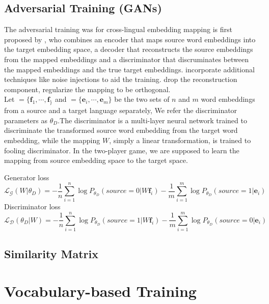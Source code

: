 \subsection{Adversarial Training (GANs)}
The adversarial training was for cross-lingual embedding mapping is first proposed by {}, who combines an encoder that maps source word embeddings into the target embedding space, a decoder that reconstructs the source embeddings from the mapped embeddings and a discriminator that discruminates between the mapped embeddings and the true target embeddings. \cite{zhang2017adversarial} incorporate additional techniques like noise injections to aid the training. \cite{conneau2017word} drop the reconstruction component, regularize the mapping to be orthogonal.\\
Let ${=\{ \bm{f}_1, \cdots, \bm{f}_\}}$ and ${ = \{ \bm{e}_i, \cdots , \bm{e}_m\}}$ be the two sets of $n$ and $m$ word embeddings from a source and a target language separately, We refer the discriminator parameters as ${\theta_D}$.The discriminator is a multi-layer neural network trained to discriminate the transformed source word embedding from the target word embedding, while the mapping $W$, simply a linear transformation, is trained to fooling discriminator. In the two-player game, we are supposed to learn the mapping from source embedding space to the target space.

Generator loss 
\[ \mathcal{L_G}(W|\theta_D) =  -\frac{1}{n} \sum_{i=1}^{n}\log P_{\theta_D}(source=0|W \bm{f}_i) - \frac{1}{m} \sum_{i=1}^{m} \log P_{\theta_D}(source = 1 | \bm{e}_i) \]
Discriminator loss
\[ \mathcal{L_D}(\theta_D | W) =  -\frac{1}{n} \sum_{i=1}^{n} \log P_{\theta_D}(source = 1| W\bm{f}_i) - \frac{1}{m} \sum_{i=1}^{m} \log P_{\theta_D}(source=0| \bm{e}_i) \]	

%
\subsection{Similarity Matrix}


\section{Vocabulary-based Training}
